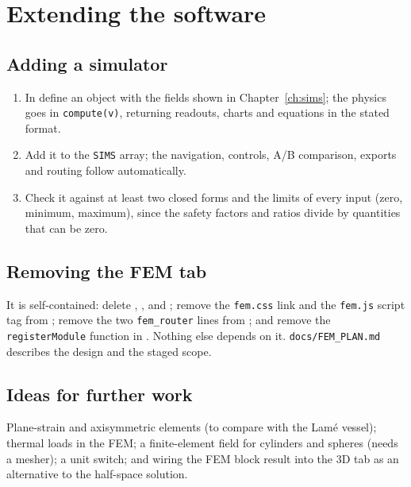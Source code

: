 \appendix
\chapter{Extending the software}
\label{app:ext}
\section{Adding a simulator}
\begin{enumerate}[nosep]
\item In  define an object with the fields shown in Chapter~\ref{ch:sims}; the physics goes in \texttt{compute(v)}, returning readouts, charts and equations in the stated format.
\item Add it to the \texttt{SIMS} array; the navigation, controls, A/B comparison, exports and routing follow automatically.
\item Check it against at least two closed forms and the limits of every input (zero, minimum, maximum), since the safety factors and ratios divide by quantities that can be zero.
\end{enumerate}

\section{Removing the FEM tab}
It is self-contained: delete , ,  and ; remove the \texttt{fem.css} link and the \texttt{fem.js} script tag from ; remove the two \texttt{fem\_router} lines from ; and remove the \texttt{registerModule} function in . Nothing else depends on it. \texttt{docs/FEM\_PLAN.md} describes the design and the staged scope.

\section{Ideas for further work}
Plane-strain and axisymmetric elements (to compare with the Lam\'e vessel); thermal loads in the FEM; a finite-element field for cylinders and spheres (needs a mesher); a unit switch; and wiring the FEM block result into the 3D tab as an alternative to the half-space solution.

